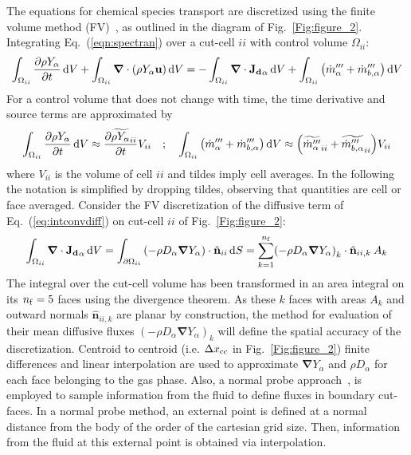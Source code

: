 \documentclass[journal,article,atmosphere,submit,moreauthors,pdftex]{Definitions/mdpi}
\newcommand{\dV}{{\rm d}V}
\newcommand{\dS}{{\rm d}S}
\begin{document}
The equations for chemical species transport are discretized using the finite volume method (FV)~\cite{eymard_2000,leveque_2002}, as outlined in the diagram of Fig.~\ref{Fig:figure_2}. Integrating Eq.~(\ref{eqn:spectran}) over a cut-cell $ii$ with control volume $\Omega_{ii}$:
\begin{equation}
 \int_{\Omega_{ii}} {\frac{\partial \rho Y_\alpha}{\partial t}} \, \dV + \int_{\Omega_{ii}} { \boldsymbol{\nabla} \cdot  \left(  \rho Y_\alpha \mathbf{u} \right)
      } \, \dV  = -\int_{\Omega_{ii}} { \boldsymbol{\nabla} \cdot \mathbf{J_{d}}_\alpha   } \, \dV + \int_{\Omega_{ii}} { \left( \dot{m}_\alpha'''+\dot{m}_{b,\alpha}''' \right) } \, \dV \label{eq:intconvdiff}
\end{equation}
For a control volume that does not change with time, the time derivative and source terms are approximated by
\begin{equation}
  \int_{\Omega_{ii}} {\frac{\partial \rho Y_\alpha}{\partial t}} \, \dV \approx \frac{\partial \widetilde{\rho Y_\alpha }_{ii}}{\partial t} V_{ii} \quad ; \quad
  \int_{\Omega_{ii}} { \left( \dot{m}_\alpha''' +\dot{m}_{b,\alpha}''' \right)} \, \dV \approx \left(\widetilde{ \dot{m}_\alpha''' }_{ii}+ \widetilde{\dot{m}_{b,\alpha}'''}_{ii} \right) V_{ii} \label{eq:intcons}
\end{equation}
where $V_{ii}$ is the volume of cell $ii$ and tildes imply cell averages. In the following the notation is simplified by dropping tildes, observing that quantities are cell or face averaged. Consider the FV discretization of the diffusive term of Eq.~(\ref{eq:intconvdiff}) on cut-cell $ii$ of Fig.~\ref{Fig:figure_2}:
\begin{equation}
\int_{\Omega_{ii}} { \boldsymbol{\nabla} \cdot   \mathbf{J_{d}}_\alpha   } \, \dV =
    \int_{\partial \Omega_{ii}} { \left( - \rho D_\alpha \boldsymbol{\nabla} Y_\alpha \right) \cdot \hat{\mathbf{n}}_{ii} } \, \dS = \sum^{n_{\rm f}}_{k=1}
    \left( - \rho D_\alpha \boldsymbol{\nabla} Y_\alpha \right)_k \cdot \hat{\mathbf{n}}_{ii,k} \: A_k \label{eq:discfvdiffcc}
\end{equation}
The integral over the cut-cell volume has been transformed in an area integral on its $n_{\rm f}=5$ faces using the divergence theorem. As these $k$ faces with areas $A_k$ and outward normals $\hat{\mathbf{n}}_{ii,k}$ are planar by construction, the method for evaluation of their mean diffusive fluxes $\left( - \rho D_\alpha \boldsymbol{\nabla} Y_\alpha \right)_k$ will define the spatial accuracy of the discretization. Centroid to centroid (i.e. $\Delta x_{\rm cc}$ in Fig.~\ref{Fig:figure_2}) finite differences and linear interpolation are used to approximate $\boldsymbol{\nabla} Y_\alpha$ and $\rho D_\alpha$ for each face belonging to the gas phase. Also, a normal probe approach~\cite{balaras_2004}, is employed to sample information from the fluid to define fluxes in boundary cut-faces. In a normal probe method, an external point is defined at a normal distance from the body of the order of the cartesian grid size. Then, information from the fluid at this external point is obtained via interpolation. 
\end{document}
